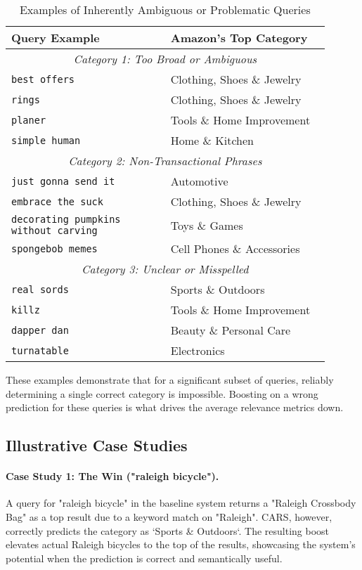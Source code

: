 \documentclass[12pt, a4paper]{article}
\begin{document}
\begin{table}[H]
\centering
\caption{Examples of Inherently Ambiguous or Problematic Queries}
\label{tab:problem_queries}
\begin{tabular}{p{0.45\linewidth} p{0.45\linewidth}}
\toprule
\textbf{Query Example} & \textbf{Amazon's Top Category} \\
\midrule
\multicolumn{2}{c}{\textit{Category 1: Too Broad or Ambiguous}} \\
\texttt{best offers} & Clothing, Shoes \& Jewelry \\
\texttt{rings} & Clothing, Shoes \& Jewelry \\
\texttt{planer} & Tools \& Home Improvement \\
\texttt{simple human} & Home \& Kitchen \\
\midrule
\multicolumn{2}{c}{\textit{Category 2: Non-Transactional Phrases}} \\
\texttt{just gonna send it} & Automotive \\
\texttt{embrace the suck} & Clothing, Shoes \& Jewelry \\
\texttt{decorating pumpkins without carving} & Toys \& Games \\
\texttt{spongebob memes} & Cell Phones \& Accessories \\
\midrule
\multicolumn{2}{c}{\textit{Category 3: Unclear or Misspelled}} \\
\texttt{real sords} & Sports \& Outdoors \\
\texttt{killz} & Tools \& Home Improvement \\
\texttt{dapper dan} & Beauty \& Personal Care \\
\texttt{turnatable} & Electronics \\
\bottomrule
\end{tabular}
\end{table}

These examples demonstrate that for a significant subset of queries, reliably determining a single correct category is impossible. Boosting on a wrong prediction for these queries is what drives the average relevance metrics down.

\subsection{Illustrative Case Studies}

\paragraph{Case Study 1: The Win ("raleigh bicycle").}
A query for "raleigh bicycle" in the baseline system returns a "Raleigh Crossbody Bag" as a top result due to a keyword match on "Raleigh". CARS, however, correctly predicts the category as `Sports \& Outdoors`. The resulting boost elevates actual Raleigh bicycles to the top of the results, showcasing the system's potential when the prediction is correct and semantically useful.
\end{document}
